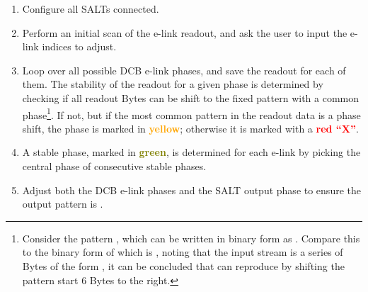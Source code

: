 \begin{enumerate}
    \item Configure all SALTs connected.

    \item Perform an initial scan of the e-link readout,
        and ask the user to input the e-link indices to adjust.

    \item Loop over all possible DCB e-link phases, and save the readout for
        each of them.
        The stability of the readout for a given phase is determined by checking
        if all readout Bytes can be shift to the fixed pattern
         with a common phase\footnote{
            Consider the pattern , which can be written in binary
            form as .
            Compare this to the binary form of  which is
            ,
            noting that the input stream is a series of Bytes of the form
            ,
            it can be concluded that  can reproduce 
            by shifting the pattern start 6 Bytes to the right.
        }.
        If not, but if the most common pattern in the readout data is a phase
        shift,
        the phase is marked in \textcolor{orange}{\bfseries yellow};
        otherwise it is marked with a \textcolor{red}{\bfseries red ``X''}.

    \item A stable phase,
        marked in \textcolor{olive}{\bfseries green},
        is determined for each e-link by picking
        the central phase of consecutive stable phases.

    \item Adjust both the DCB e-link phases and the SALT output phase
        to ensure the output pattern is .
\end{enumerate}

